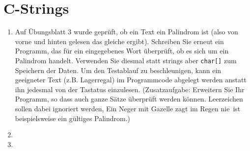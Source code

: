 \documentclass[paper=a4, fontsize=11pt, twoside]{scrartcl}
\begin{document}
\section*{C-Strings}
\begin{enumerate}
  \item Auf Übungsblatt 3 wurde geprüft, ob ein Text ein Palindrom ist (also von vorne und hinten gelesen das gleiche ergibt). Schreiben Sie erneut ein Programm, das für ein eingegebenes Wort überprüft, ob es sich um ein Palindrom handelt. Verwenden Sie diesmal statt strings aber \texttt{char[]} zum Speichern der Daten. Um den Testablauf zu beschleunigen, kann ein geeigneter Text (z.B. \glqq Lagerregal\grqq) im Programmcode abgelegt werden anstatt ihn jedesmal von der Tastatus einzulesen. (Zusatzaufgabe: Erweitern Sie Ihr Programm, so dass auch ganze Sätze überprüft werden können. Leerzeichen sollen dabei ignoriert werden, \glqq Ein Neger mit Gazelle zagt im Regen nie\grqq\, ist beispielsweise ein gültiges Palindrom.)
  \item 
  \item 
\end{enumerate}
\end{document}
